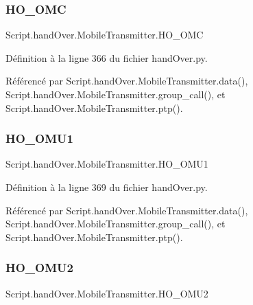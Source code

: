 \subsubsection{\texorpdfstring{H\+O\+\_\+\+O\+MC}{HO\_OMC}}
{\footnotesize\ttfamily Script.\+hand\+Over.\+Mobile\+Transmitter.\+H\+O\+\_\+\+O\+MC}



Définition à la ligne 366 du fichier hand\+Over.\+py.



Référencé par Script.\+hand\+Over.\+Mobile\+Transmitter.\+data(), Script.\+hand\+Over.\+Mobile\+Transmitter.\+group\+\_\+call(), et Script.\+hand\+Over.\+Mobile\+Transmitter.\+ptp().

\mbox{\label{classScript_1_1handOver_1_1MobileTransmitter_ae5933fac2e95221c47244fafcf33ff88}} 
\subsubsection{\texorpdfstring{H\+O\+\_\+\+O\+M\+U1}{HO\_OMU1}}
{\footnotesize\ttfamily Script.\+hand\+Over.\+Mobile\+Transmitter.\+H\+O\+\_\+\+O\+M\+U1}



Définition à la ligne 369 du fichier hand\+Over.\+py.



Référencé par Script.\+hand\+Over.\+Mobile\+Transmitter.\+data(), Script.\+hand\+Over.\+Mobile\+Transmitter.\+group\+\_\+call(), et Script.\+hand\+Over.\+Mobile\+Transmitter.\+ptp().

\mbox{\label{classScript_1_1handOver_1_1MobileTransmitter_aab1fb4256449d1379f82f6e7e741f8c0}} 
\subsubsection{\texorpdfstring{H\+O\+\_\+\+O\+M\+U2}{HO\_OMU2}}
{\footnotesize\ttfamily Script.\+hand\+Over.\+Mobile\+Transmitter.\+H\+O\+\_\+\+O\+M\+U2}



